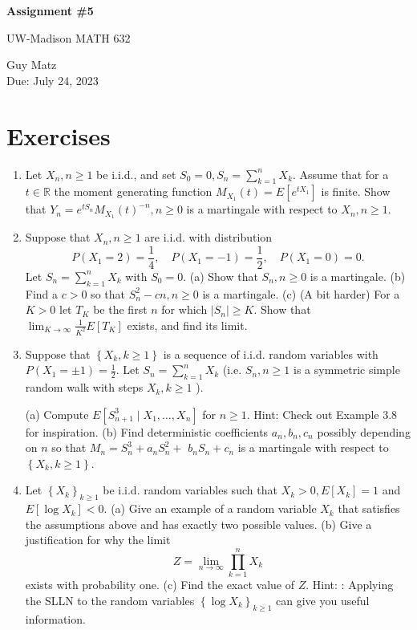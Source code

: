 \documentclass{article} %
\theoremstyle{plain}
\theoremstyle{case}
\begin{document}
\begin{center}
\Large{\textbf{Assignment \#5}
            
UW-Madison MATH 632} %
\vspace{5pt}
        
\normalsize{  Guy Matz%
        \\ Due: July 24, 2023}
\vspace{15pt}
\end{center}

\section*{Exercises}%

\begin{enumerate}[label={\fbox{\textbf{Exercise \#\arabic* :}}}]

  \item Let $X_n, n \geq 1$ be i.i.d., and set $S_0=0, S_n=\sum_{k=1}^n X_k$. Assume that for a $t \in \mathbb{R}$ the moment generating function $M_{X_1}(t)=E\left[e^{t X_1}\right]$ is finite. Show that $Y_n=e^{t S_n} M_{X_1}(t)^{-n}, n \geq 0$ is a martingale with respect to $X_n, n \geq 1$.

\newpage
  \item Suppose that $X_n, n \geq 1$ are i.i.d. with distribution
$$
P\left(X_1=2\right)=\frac{1}{4}, \quad P\left(X_1=-1\right)=\frac{1}{2}, \quad P\left(X_1=0\right)=0 .
$$
Let $S_n=\sum_{k=1}^n X_k$ with $S_0=0$.
(a) Show that $S_n, n \geq 0$ is a martingale.
(b) Find a $c>0$ so that $S_n^2-c n, n \geq 0$ is a martingale.
(c) (A bit harder) For a $K>0$ let $T_K$ be the first $n$ for which $\left|S_n\right| \geq K$. Show that $\lim _{K \rightarrow \infty} \frac{1}{K^2} E\left[T_K\right]$ exists, and find its limit.

\newpage
  \item Suppose that $\left\{X_k, k \geq 1\right\}$ is a sequence of i.i.d. random variables with $P\left(X_1= \pm 1\right)=\frac{1}{2}$. Let $S_n=\sum_{k=1}^n X_k$ (i.e. $S_n, n \geq 1$ is a symmetric simple random walk with steps $X_k, k \geq 1$ ).

(a) Compute $E\left[S_{n+1}^3 \mid X_1, \ldots, X_n\right]$ for $n \geq 1$.
Hint: Check out Example 3.8 for inspiration.
(b) Find deterministic coefficients $a_n, b_n, c_n$ possibly depending on $n$ so that $M_n=S_n^3+a_n S_n^2+$ $b_n S_n+c_n$ is a martingale with respect to $\left\{X_k, k \geq 1\right\}$.
\newpage

  \item Let $\left\{X_k\right\}_{k \geq 1}$ be i.i.d. random variables such that $X_k>0, E\left[X_k\right]=1$ and $E\left[\log X_k\right]<0$.
(a) Give an example of a random variable $X_k$ that satisfies the assumptions above and has exactly two possible values.
(b) Give a justification for why the limit
$$
Z=\lim _{n \rightarrow \infty} \prod_{k=1}^n X_k
$$
exists with probability one.
(c) Find the exact value of $Z$. Hint: : Applying the SLLN to the random variables $\left\{\log X_k\right\}_{k \geq 1}$ can give you useful information.


\end{enumerate}
\end{document}
